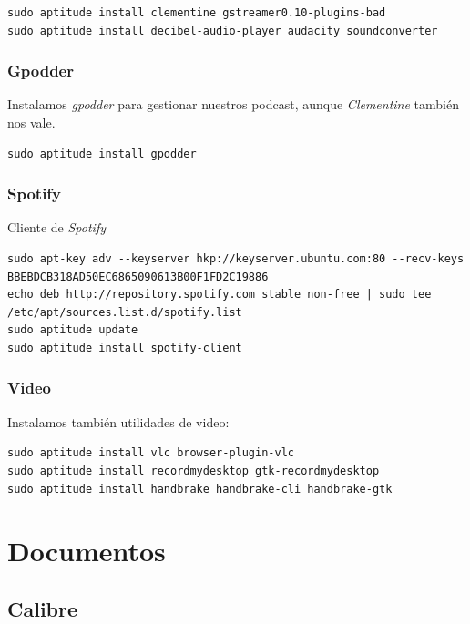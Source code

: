\documentclass[12pt,spanish,]{article}
\begin{document}
\begin{verbatim}
sudo aptitude install clementine gstreamer0.10-plugins-bad
sudo aptitude install decibel-audio-player audacity soundconverter
\end{verbatim}

\subsubsection{Gpodder}\label{gpodder}

Instalamos \emph{gpodder} para gestionar nuestros podcast, aunque
\emph{Clementine} también nos vale.

\begin{verbatim}
sudo aptitude install gpodder
\end{verbatim}

\subsubsection{Spotify}\label{spotify}

Cliente de \emph{Spotify}

\begin{verbatim}
sudo apt-key adv --keyserver hkp://keyserver.ubuntu.com:80 --recv-keys BBEBDCB318AD50EC6865090613B00F1FD2C19886
echo deb http://repository.spotify.com stable non-free | sudo tee /etc/apt/sources.list.d/spotify.list
sudo aptitude update
sudo aptitude install spotify-client
\end{verbatim}

\subsubsection{Video}\label{video}

Instalamos también utilidades de video:

\begin{verbatim}
sudo aptitude install vlc browser-plugin-vlc
sudo aptitude install recordmydesktop gtk-recordmydesktop
sudo aptitude install handbrake handbrake-cli handbrake-gtk
\end{verbatim}

\section{Documentos}\label{documentos}

\subsection{Calibre}\label{calibre}
\end{document}
